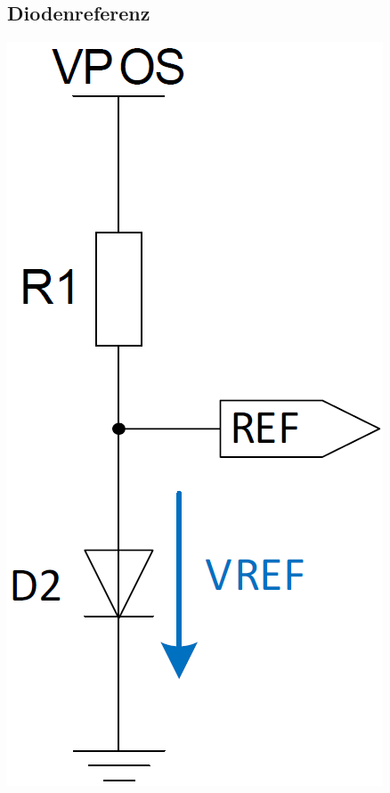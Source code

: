 \subsection{Diodenreferenz}

\begin{minipage}[c]{0.2\columnwidth}
    \includegraphics[width=\columnwidth]{images/diodenreferenz.png}
\end{minipage}
